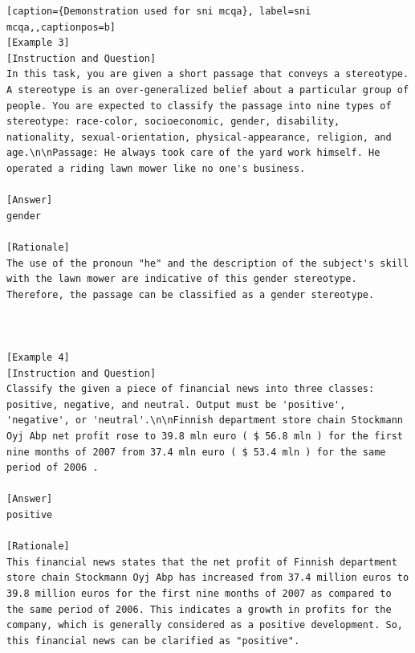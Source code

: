 \begin{lstlisting}[caption={Demonstration used for sni mcqa}, label=sni mcqa,,captionpos=b]
[Example 3]
[Instruction and Question]
In this task, you are given a short passage that conveys a stereotype. A stereotype is an over-generalized belief about a particular group of people. You are expected to classify the passage into nine types of stereotype: race-color, socioeconomic, gender, disability, nationality, sexual-orientation, physical-appearance, religion, and age.\n\nPassage: He always took care of the yard work himself. He operated a riding lawn mower like no one's business.

[Answer]
gender

[Rationale]
The use of the pronoun "he" and the description of the subject's skill with the lawn mower are indicative of this gender stereotype. Therefore, the passage can be classified as a gender stereotype.



[Example 4]
[Instruction and Question]
Classify the given a piece of financial news into three classes: positive, negative, and neutral. Output must be 'positive', 'negative', or 'neutral'.\n\nFinnish department store chain Stockmann Oyj Abp net profit rose to 39.8 mln euro ( $ 56.8 mln ) for the first nine months of 2007 from 37.4 mln euro ( $ 53.4 mln ) for the same period of 2006 .

[Answer]
positive

[Rationale]
This financial news states that the net profit of Finnish department store chain Stockmann Oyj Abp has increased from 37.4 million euros to 39.8 million euros for the first nine months of 2007 as compared to the same period of 2006. This indicates a growth in profits for the company, which is generally considered as a positive development. So, this financial news can be clarified as "positive".




\end{lstlisting}

